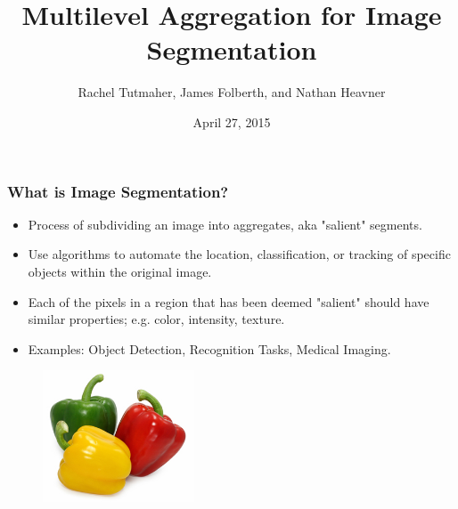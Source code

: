 \documentclass[8pt]{beamer}
\begin{document}
\title{Multilevel Aggregation for Image Segmentation}
\author[]{Rachel Tutmaher, James Folberth, and Nathan  Heavner\\}

\date{April 27, 2015}

\begin{frame}
\titlepage
\end{frame}

\begin{frame}
\frametitle{What is Image Segmentation?}
\begin{itemize}
\item Process of subdividing an image into aggregates, aka "salient" segments.
\item Use algorithms to automate the location, classification, or tracking of specific objects within the original image.
\item Each of the pixels in a region that has been deemed "salient" should have similar properties; e.g. color, intensity, texture.
\item Examples: Object Detection, Recognition Tasks, Medical Imaging.
\end{itemize}

\begin{figure}
\centering
\includegraphics[width=0.4\textwidth,height=0.4\textwidth]{peppers_original.jpg} \hspace{.45cm}
\end{figure}
\end{frame}
\end{document}
